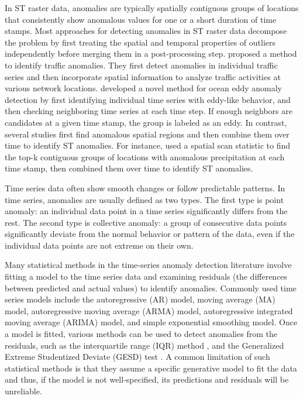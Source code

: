 \documentclass[11pt]{article}
\begin{document}
In ST raster data, anomalies are typically spatially contiguous groups of locations that consistently show anomalous values for one or a short duration of time stamps. Most approaches for detecting anomalies in ST raster data decompose the problem by first treating the spatial and temporal properties of outliers independently before merging them in a post-processing step. \citet{paschalidis2008spatio} proposed a method to identify traffic anomalies. They first detect anomalies in individual traffic series and then incorporate spatial information to analyze traffic activities at various network locations. \citet{faghmous2012novel} developed a novel method for ocean eddy anomaly detection by first identifying individual time series with eddy-like behavior, and then checking neighboring time series at each time step. If enough neighbors are candidates at a given time stamp, the group is labeled as an eddy. In contrast, several studies first find anomalous spatial regions and then combine them over time to identify ST anomalies. For instance, \citet{wu2010spatio} used a spatial scan statistic to find the top-k contiguous groups of locations with anomalous precipitation at each time stamp, then combined them over time to identify ST anomalies.





Time series data often show smooth changes or follow predictable patterns. In time series, anomalies are usually defined as two types. The first type is point anomaly: an individual data point in a time series significantly differs from the rest. The second type is collective anomaly: a group of consecutive data points significantly deviate from the normal behavior or pattern of the data, even if the individual data points are not extreme on their own. 

Many statistical methods in the time-series anomaly detection literature involve fitting a model to the time series data and examining residuals (the differences between predicted and actual values) to identify anomalies. Commonly used time series models include the autoregressive (AR) model, moving average (MA) model, autoregressive moving average (ARMA) model, autoregressive integrated moving average (ARIMA) model, and simple exponential smoothing model. Once a model is fitted, various methods can be used to detect anomalies from the residuals, such as the interquartile range (IQR) method \citep{IQR}, and the Generalized Extreme Studentized Deviate (GESD) test \citep{rosner1983percentage}. A common limitation of such statistical methods is that they assume a specific generative model to fit the data and thus, if the model is not well-specified, its predictions and residuals will be unreliable. 
\end{document}
